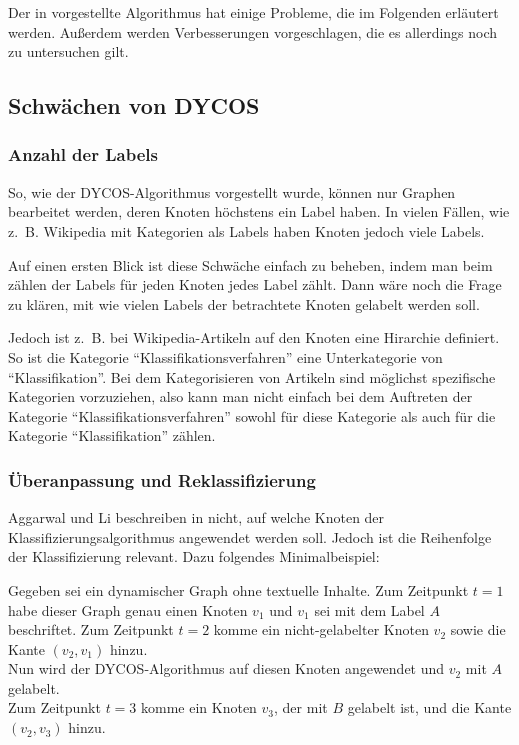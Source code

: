 Der in \cite{aggarwal2011} vorgestellte Algorithmus hat einige Probleme,
die im Folgenden erläutert werden. Außerdem werden Verbesserungen
vorgeschlagen, die es allerdings noch zu untersuchen gilt.

\subsection{Schwächen von DYCOS}
\subsubsection{Anzahl der Labels}
So, wie der DYCOS-Algorithmus vorgestellt wurde, können nur Graphen bearbeitet werden, 
deren Knoten höchstens ein Label haben. In vielen Fällen, wie z.~B. 
Wikipedia mit Kategorien als Labels haben Knoten jedoch viele Labels.

Auf einen ersten Blick ist diese Schwäche einfach zu beheben, indem 
man beim zählen der Labels für jeden Knoten jedes Label zählt. Dann
wäre noch die Frage zu klären, mit wie vielen Labels der betrachtete
Knoten gelabelt werden soll.

Jedoch ist z.~B. bei Wikipedia-Artikeln auf den Knoten eine 
Hirarchie definiert. So ist die Kategorie \enquote{Klassifikationsverfahren}
eine Unterkategorie von \enquote{Klassifikation}. Bei dem Kategorisieren
von Artikeln sind möglichst spezifische Kategorien vorzuziehen, also
kann man nicht einfach bei dem Auftreten der Kategorie \enquote{Klassifikationsverfahren}
sowohl für diese Kategorie als auch für die Kategorie \enquote{Klassifikation}
zählen.


\subsubsection{Überanpassung und Reklassifizierung}
Aggarwal und Li beschreiben in \cite{aggarwal2011} nicht, auf welche
Knoten der Klassifizierungsalgorithmus angewendet werden soll. Jedoch
ist die Reihenfolge der Klassifizierung relevant. Dazu folgendes 
Minimalbeispiel:

Gegeben sei ein dynamischer Graph ohne textuelle Inhalte. Zum Zeitpunkt
$t=1$ habe dieser Graph genau einen Knoten $v_1$ und $v_1$  sei
mit dem Label $A$ beschriftet. Zum Zeitpunkt $t=2$ komme ein nicht-gelabelter
Knoten $v_2$ sowie die Kante $(v_2, v_1)$ hinzu.\\
Nun wird der DYCOS-Algorithmus auf diesen Knoten angewendet und
$v_2$ mit $A$ gelabelt.\\
Zum Zeitpunkt $t=3$ komme ein Knoten $v_3$, der mit $B$ gelabelt ist,
und die Kante $(v_2, v_3)$ hinzu.

